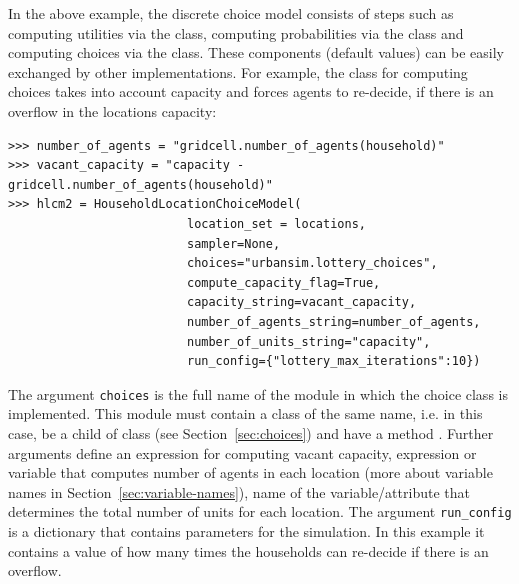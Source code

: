 In the above example, the discrete choice model consists of steps such as
computing utilities via the  class, computing
probabilities via the  class and computing
choices via the  class. These components
(default values) can be easily exchanged by other implementations. For
example, the class  for computing choices
takes into account capacity and forces agents to re-decide, if there is an
overflow in the locations capacity:
\begin{verbatim}
>>> number_of_agents = "gridcell.number_of_agents(household)"
>>> vacant_capacity = "capacity - gridcell.number_of_agents(household)"
>>> hlcm2 = HouseholdLocationChoiceModel(
                         location_set = locations,
                         sampler=None,
                         choices="urbansim.lottery_choices",
                         compute_capacity_flag=True,
                         capacity_string=vacant_capacity,
                         number_of_agents_string=number_of_agents,
                         number_of_units_string="capacity",
                         run_config={"lottery_max_iterations":10})
\end{verbatim}

The argument \verb|choices| is the full name of the module in which the choice
class is implemented. This module
must contain a class of the same name, i.e.
 in this case, be a child of  class 
(see Section~\ref{sec:choices}) and have a method .  Further arguments define an expression 
for computing vacant capacity, expression or variable that computes number of agents in
each location (more about variable names in Section~\ref{sec:variable-names}), name of the
variable/attribute that determines the total number of units for each location. 
The argument \verb|run_config| is a dictionary that contains parameters for the simulation. In this example it contains a value
of how many times the households can re-decide if there is an overflow.

